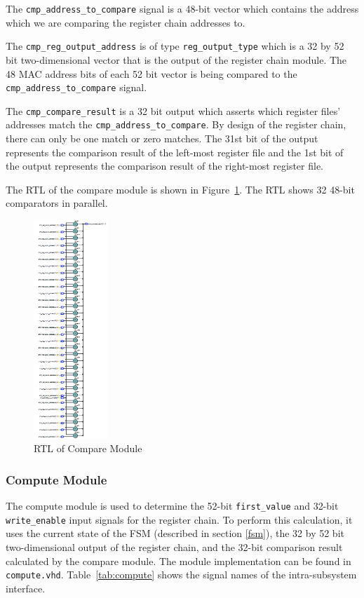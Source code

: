 \documentclass{article}
\begin{document}
The \texttt{cmp\_address\_to\_compare} signal is a 48-bit vector which contains the address which we are comparing the register chain addresses to. 

The \texttt{cmp\_reg\_output\_address} is of type \texttt{reg\_output\_type} which is a 32 by 52 bit two-dimensional vector that is the output of the register chain module. The 48 MAC address bits of each 52 bit vector is being compared to the \texttt{cmp\_address\_to\_compare} signal. 

The \texttt{cmp\_compare\_result} is a 32 bit output which asserts which register files' addresses match the \texttt{cmp\_address\_to\_compare}. By design of the register chain, there can only be one match or zero matches. The 31st bit of the output represents the comparison result of the left-most register file and the 1st bit of the output represents the comparison result of the right-most register file.

The RTL of the compare module is shown in Figure~\ref{fig:compare-rtl}. The RTL shows 32 48-bit comparators in parallel.

\begin{figure}[ht!]
  \centering
  	\includegraphics[width=0.25\textwidth]{compare_rtl.PNG}
  \caption{RTL of Compare Module}
  \label{fig:compare-rtl}
\end{figure}

\newpage
\subsubsection{Compute Module}

The compute module is used to determine the 52-bit \texttt{first\_value} and 32-bit \texttt{write\_enable} input signals for the register chain. To perform this calculation, it uses the current state of the FSM (described in section \ref{fsm}), the 32 by 52 bit two-dimensional output of the register chain, and the 32-bit comparison result calculated by the compare module. The module implementation can be found in \texttt{compute.vhd}. Table~\ref{tab:compute} shows the signal names of the intra-subsystem interface. 
\end{document}

